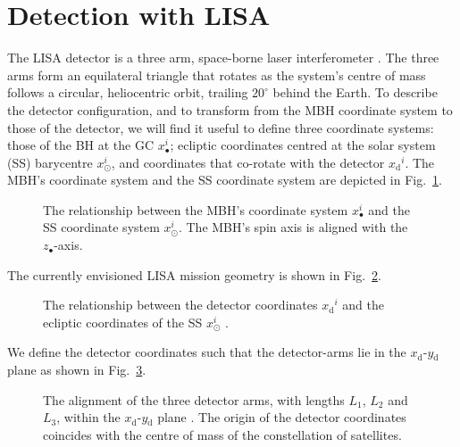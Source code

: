 \documentclass[useAMS,usedcolumn,usegraphicx,usenatbib]{mn2e}
\newcommand{\figref}[1]{Fig.~\ref{fig:#1}}
\newcommand{\sub}[1]{\ensuremath{_\mathrm{#1}}}
\begin{document}
\section{Detection with LISA\label{sec:Detector}}

The LISA detector is a three arm, space-borne laser interferometer \citep{Bender1998, Danzmann2003}. The three arms form an equilateral triangle that rotates as the system's centre of mass follows a circular, heliocentric orbit, trailing $20^{\circ}$ behind the Earth. To describe the detector configuration, and to transform from the MBH coordinate system to those of the detector, we will find it useful to define three coordinate systems: those of the BH at the GC $x_\bullet^i$; ecliptic coordinates centred at the solar system (SS) barycentre $x_\odot^i$, and coordinates that co-rotate with the detector $x\sub{d}^i$. The MBH's coordinate system and the SS coordinate system are depicted in \figref{BH_SS}.
\begin{figure}[tbhp]
\begin{center}
    \caption{The relationship between the MBH's coordinate system $x_\bullet^i$ and the SS coordinate system $x_\odot^i$. The MBH's spin axis is aligned with the $z_\bullet$-axis.}
   \label{fig:BH_SS}
\end{center}
\end{figure}
The currently envisioned LISA mission geometry is shown in \figref{SS_LISA}.
\begin{figure}
\begin{center}
    \caption{The relationship between the detector coordinates $x\sub{d}^i$ and the ecliptic coordinates of the SS $x_\odot^i$ \citep{Bender1998}.}
   \label{fig:SS_LISA}
\end{center}
\end{figure}
We define the detector coordinates such that the detector-arms lie in the $x\sub{d}$-$y\sub{d}$ plane as shown in \figref{LISA_arms}.
\begin{figure}
\begin{center}
    \caption{The alignment of the three detector arms, with lengths $L_1$, $L_2$ and $L_3$, within the $x\sub{d}$-$y\sub{d}$ plane \citep{Cutler1998}. The origin of the detector coordinates coincides with the centre of mass of the constellation of satellites.}
   \label{fig:LISA_arms}
\end{center}
\end{figure}
\end{document}

